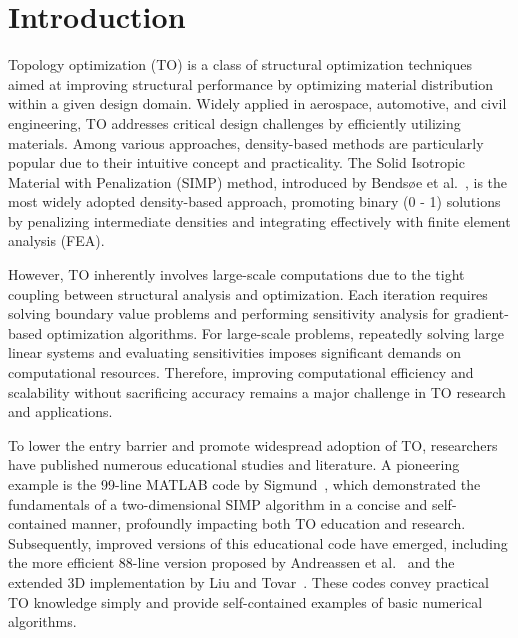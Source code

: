 \documentclass[mathpazo]{cicp}
\begin{document}
\section{Introduction}
Topology optimization (TO) is a class of structural optimization techniques aimed at improving structural performance by optimizing material distribution within a given design domain. Widely applied in aerospace, automotive, and civil engineering, TO addresses critical design challenges by efficiently utilizing materials. Among various approaches, density-based methods are particularly popular due to their intuitive concept and practicality. The Solid Isotropic Material with Penalization (SIMP) method, introduced by Bendsøe et al.~\cite{Bendsøe2004}, is the most widely adopted density-based approach, promoting binary (0 - 1) solutions by penalizing intermediate densities and integrating effectively with finite element analysis (FEA).

However, TO inherently involves large-scale computations due to the tight coupling between structural analysis and optimization. Each iteration requires solving boundary value problems and performing sensitivity analysis for gradient-based optimization algorithms. For large-scale problems, repeatedly solving large linear systems and evaluating sensitivities imposes significant demands on computational resources. Therefore, improving computational efficiency and scalability without sacrificing accuracy remains a major challenge in TO research and applications.

To lower the entry barrier and promote widespread adoption of TO, researchers have published numerous educational studies and literature. A pioneering example is the 99-line MATLAB code by Sigmund~\cite{sigmund200199}, which demonstrated the fundamentals of a two-dimensional SIMP algorithm in a concise and self-contained manner, profoundly impacting both TO education and research. Subsequently, improved versions of this educational code have emerged, including the more efficient 88-line version proposed by Andreassen et al.~\cite{andreassen2011efficient} and the extended 3D implementation by Liu and Tovar~\cite{liu2014efficient}. These codes convey practical TO knowledge simply and provide self-contained examples of basic numerical algorithms.
\end{document}
